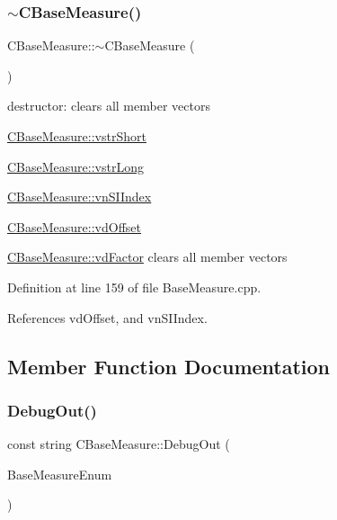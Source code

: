 \mbox{\label{classCBaseMeasure_aca2735196a7e6e6524d73327d95d4a19}} 
\subsubsection{\texorpdfstring{$\sim$\+C\+Base\+Measure()}{~CBaseMeasure()}}
{\footnotesize\ttfamily C\+Base\+Measure\+::$\sim$\+C\+Base\+Measure (\begin{DoxyParamCaption}{ }\end{DoxyParamCaption})}



destructor\+: clears all member vectors 


\begin{DoxyItemize}
\item \hyperlink{classCVectorHandle_afb50c8a33d4cf70bf92c644dca409ea2}{C\+Base\+Measure\+::vstr\+Short}
\item \hyperlink{classCVectorHandle_a71bec0e385b9ca8e5ffa174b559da9f8}{C\+Base\+Measure\+::vstr\+Long}
\item \hyperlink{classCBaseMeasure_aaaddf8a6ce321b282885953439472390}{C\+Base\+Measure\+::vn\+S\+I\+Index}
\item \hyperlink{classCBaseMeasure_a7220e3dfd4fbdd319a5c3c6af844259e}{C\+Base\+Measure\+::vd\+Offset}
\item \hyperlink{classCVectorHandle_af8f8b2e0da8363e695872ca85f33364e}{C\+Base\+Measure\+::vd\+Factor} clears all member vectors 
\end{DoxyItemize}

Definition at line 159 of file Base\+Measure.\+cpp.



References vd\+Offset, and vn\+S\+I\+Index.



\subsection{Member Function Documentation}
\mbox{\label{classCBaseMeasure_acb998b7f15d9aa3530b2cb0b910177fd}} 
\subsubsection{\texorpdfstring{Debug\+Out()}{DebugOut()}}
{\footnotesize\ttfamily const string C\+Base\+Measure\+::\+Debug\+Out (\begin{DoxyParamCaption}\item[{const \hyperlink{BaseMeasure_8h_ac90e5164ccf1f0d648fba7e94b229a11}{e\+Base\+Measure}}]{Base\+Measure\+Enum }\end{DoxyParamCaption})}



